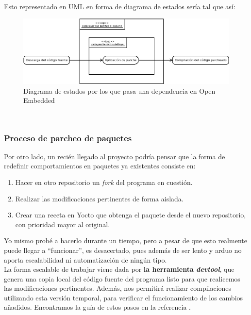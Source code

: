 Esto representado en UML en forma de diagrama de estados sería tal que así:

\begin{figure}[H]
	\centering
	\includegraphics[width=\linewidth]{imagenes/statechart-parche.png}
	\caption{Diagrama de estados por los que pasa una dependencia en Open Embedded}
	\label{statechart-parche}
\end{figure}

\noindent\makebox[\linewidth]{\rule{\textwidth}{0.4pt}}\\

\subsubsection{Proceso de parcheo de paquetes}

Por otro lado, un recién llegado al proyecto podría pensar que la forma de redefinir comportamientos en paquetes ya existentes consiste en:

\begin{enumerate}
	\item Hacer en otro repositorio un \textit{fork} del programa en cuestión.
	\item Realizar las modificaciones pertinentes de forma aislada.
	\item Crear una receta en Yocto que obtenga el paquete desde el nuevo repositorio, con prioridad mayor al original.
\end{enumerate}

Yo mismo probé a hacerlo durante un tiempo, pero a pesar de que esto realmente puede llegar a ``funcionar'', es desacertado, pues además de ser lento y arduo no aporta escalabilidad ni automatización de ningún tipo.\\

La forma escalable de trabajar viene dada por \textbf{la herramienta \textit{devtool}}, que genera una copia local del código fuente del programa listo para que realicemos las modificaciones pertinentes. Además, nos permitirá realizar compilaciones utilizando esta versión temporal, para verificar el funcionamiento de los cambios añadidos. Encontramos la guía de estos pasos en la referencia \cite{wiki-yocto-patches}.\\


